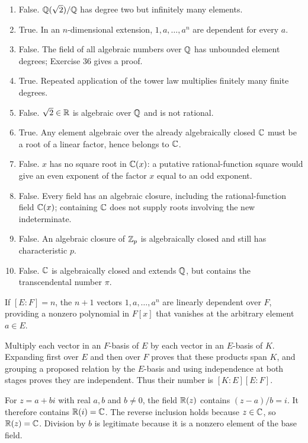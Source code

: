 \begin{enumerate}[label=(\alph*)]
\item False. $\mathbb{Q}(\sqrt2)/\mathbb{Q}$ has degree two but infinitely many elements.
\item True. In an $n$-dimensional extension, $1,a,\ldots,a^n$ are dependent for every $a$.
\item False. The field of all algebraic numbers over $\mathbb{Q}$ has unbounded element degrees; Exercise 36 gives a proof.
\item True. Repeated application of the tower law multiplies finitely many finite degrees.
\item False. $\sqrt2\in\mathbb{R}$ is algebraic over $\mathbb{Q}$ and is not rational.
\item True. Any element algebraic over the already algebraically closed $\mathbb{C}$ must be a root of a linear factor, hence belongs to $\mathbb{C}$.
\item False. $x$ has no square root in $\mathbb{C}(x)$: a putative rational-function square would give an even exponent of the factor $x$ equal to an odd exponent.
\item False. Every field has an algebraic closure, including the rational-function field $\mathbb{C}(x)$; containing $\mathbb{C}$ does not supply roots involving the new indeterminate.
\item False. An algebraic closure of $\mathbb{Z}_p$ is algebraically closed and still has characteristic $p$.
\item False. $\mathbb{C}$ is algebraically closed and extends $\mathbb{Q}$, but contains the transcendental number $\pi$.
\end{enumerate}

If $[E:F]=n$, the $n+1$ vectors $1,a,\ldots,a^n$ are linearly dependent over $F$, providing a nonzero polynomial in $F[x]$ that vanishes at the arbitrary element $a\in E$.

Multiply each vector in an $F$-basis of $E$ by each vector in an $E$-basis of $K$. Expanding first over $E$ and then over $F$ proves that these products span $K$, and grouping a proposed relation by the $E$-basis and using independence at both stages proves they are independent. Thus their number is $[K:E][E:F]$.

For $z=a+bi$ with real $a,b$ and $b\ne0$, the field $\mathbb{R}(z)$ contains $(z-a)/b=i$. It therefore contains $\mathbb{R}(i)=\mathbb{C}$. The reverse inclusion holds because $z\in\mathbb{C}$, so $\mathbb{R}(z)=\mathbb{C}$. Division by $b$ is legitimate because it is a nonzero element of the base field.


